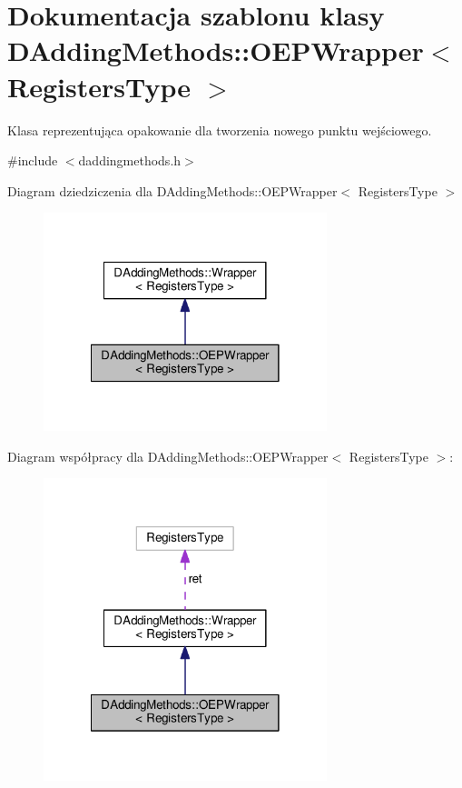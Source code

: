 \hypertarget{class_d_adding_methods_1_1_o_e_p_wrapper}{\section{Dokumentacja szablonu klasy D\-Adding\-Methods\-:\-:O\-E\-P\-Wrapper$<$ Registers\-Type $>$}
\label{class_d_adding_methods_1_1_o_e_p_wrapper}
}


Klasa reprezentująca opakowanie dla tworzenia nowego punktu wejściowego.  




{\ttfamily \#include $<$daddingmethods.\-h$>$}



Diagram dziedziczenia dla D\-Adding\-Methods\-:\-:O\-E\-P\-Wrapper$<$ Registers\-Type $>$
\nopagebreak
\begin{figure}[H]
\begin{center}
\leavevmode
\includegraphics[width=234pt]{class_d_adding_methods_1_1_o_e_p_wrapper__inherit__graph}
\end{center}
\end{figure}


Diagram współpracy dla D\-Adding\-Methods\-:\-:O\-E\-P\-Wrapper$<$ Registers\-Type $>$\-:
\nopagebreak
\begin{figure}[H]
\begin{center}
\leavevmode
\includegraphics[width=234pt]{class_d_adding_methods_1_1_o_e_p_wrapper__coll__graph}
\end{center}
\end{figure}
